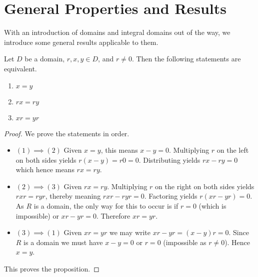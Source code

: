 \section{General Properties and Results}
With an introduction of domains and integral domains out of the way, we introduce some general results applicable to them.
\begin{proposition}\label{prop-domain-cancellation-law}
    Let $D$ be a domain, $r, x, y \in D$, and $r \neq 0$. Then the following statements are equivalent.
    \begin{enumerate}[label=(\arabic*)]
        \item $x = y$
        \item $rx = ry$
        \item $xr = yr$
    \end{enumerate}
\end{proposition}
\begin{proof}
    We prove the statements in order.
    \begin{itemize}
        \item $\boxed{(1) \implies (2)}$ Given $x = y$, this means $x - y = 0$. Multiplying $r$ on the left on both sides yields $r(x-y) = r0 = 0$. Distributing yields $rx - ry = 0$ which hence means $rx = ry$.
        
        \item $\boxed{(2) \implies (3)}$ Given $rx = ry$. Multiplying $r$ on the right on both sides yields $rxr = ryr$, thereby meaning $rxr - ryr = 0$. Factoring yields $r(xr - yr) = 0$. As $R$ is a domain, the only way for this to occur is if $r = 0$ (which is impossible) or $xr - yr = 0$. Therefore $xr = yr$.
        
        \item $\boxed{(3) \implies (1)}$ Given $xr = yr$ we may write $xr - yr = (x-y)r = 0$. Since $R$ is a domain we must have $x - y = 0$ or $r = 0$ (impossible as $r \neq 0$). Hence $x = y$.
    \end{itemize}
    This proves the proposition.
\end{proof}

